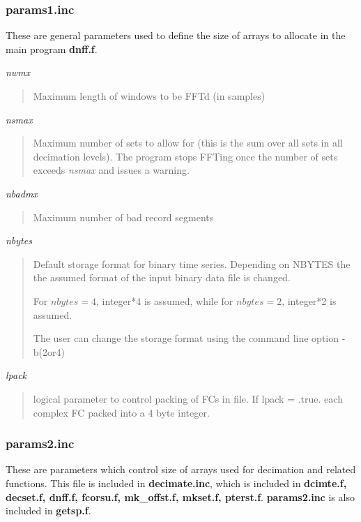\subsubsection{params1.inc}

These are general parameters used to define the
size of arrays to allocate in the main program {\bf dnff.f}.

{\it nwmx}
\begin{quote}
Maximum length of windows to be FFTd (in samples)
\end{quote}

{\it nsmax}
\begin{quote}
Maximum number of sets to allow for (this is the sum
over all sets in all decimation levels). The program stops FFTing
once the number of sets exceeds {\it nsmax} and issues a warning.
\end{quote}

{\it nbadmx}
\begin{quote}
Maximum number of bad record segments
\end{quote}

{\it nbytes}
\begin{quote}
Default storage format for binary time series.
Depending on NBYTES the the assumed format of the input
binary data file is changed. 

For $nbytes = 4$, integer*4 is assumed, while for
$nbytes = 2$, integer*2 is assumed.

The user can change the storage format using
the command line option -b(2or4)
\end{quote}

{\it lpack} 
\begin{quote}
logical parameter to control packing of FCs in 
file.  If lpack = .true. each complex FC 
packed into a 4 byte integer.
\end{quote}

\subsubsection{params2.inc}

These are parameters which control size of arrays used for
decimation and related functions.  This file is included in
{\bf decimate.inc}, which is included in {\bf dcimte.f,
decset.f, dnff.f, fcorsu.f, mk\_offst.f, mkset.f, pterst.f}.
{\bf params2.inc} is also included in {\bf getsp.f}.


